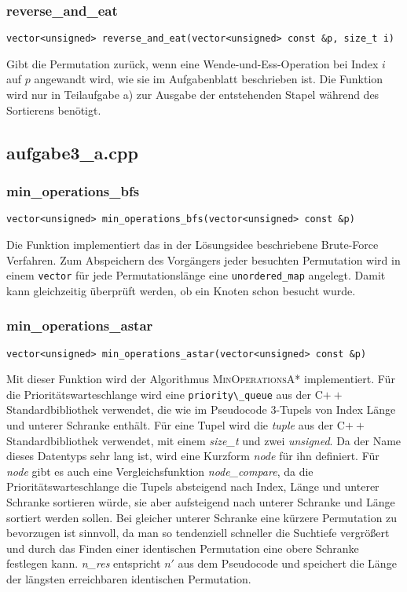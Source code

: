 \documentclass[a4paper, 10pt, ngerman]{article}
\begin{document}
\subsubsection{reverse\_and\_eat}
\verb|vector<unsigned> reverse_and_eat(vector<unsigned> const &p, size_t i)|
\medskip

\noindent Gibt die Permutation zurück, wenn eine Wende-und-Ess-Operation bei Index $i$ auf $p$ angewandt wird, wie sie im Aufgabenblatt beschrieben ist. Die Funktion wird nur in Teilaufgabe a) zur Ausgabe der entstehenden Stapel während des Sortierens benötigt.

\subsection{aufgabe3\_a.cpp}

\subsubsection{min\_operations\_bfs}
\verb|vector<unsigned> min_operations_bfs(vector<unsigned> const &p)|
\medskip

\noindent Die Funktion implementiert das in der Lösungsidee beschriebene Brute-Force Verfahren. Zum Abspeichern des Vorgängers jeder besuchten Permutation wird in einem \verb|vector| für jede Permutationslänge eine \verb|unordered_map| angelegt. Damit kann gleichzeitig überprüft werden, ob ein Knoten schon besucht wurde.

\subsubsection{min\_operations\_astar}
\verb|vector<unsigned> min_operations_astar(vector<unsigned> const &p)|
\medskip

\noindent Mit dieser Funktion wird der Algorithmus \textsc{MinOperationsA*} implementiert. Für die Prioritätswarteschlange wird eine \verb|priority\_queue| aus der C$++$ Standardbibliothek verwendet, die wie im Pseudocode 3-Tupels von Index Länge und unterer Schranke enthält. Für eine Tupel wird die \emph{tuple} aus der C$++$ Standardbibliothek verwendet, mit einem \emph{size\_t} und zwei \emph{unsigned}. Da der Name dieses Datentyps sehr lang ist, wird eine Kurzform \emph{node} für ihn definiert. Für \emph{node} gibt es auch eine Vergleichsfunktion \emph{node\_compare}, da die Prioritätswarteschlange die Tupels absteigend nach Index, Länge und unterer Schranke sortieren würde, sie aber aufsteigend nach unterer Schranke und Länge sortiert werden sollen. Bei gleicher unterer Schranke eine kürzere Permutation zu bevorzugen ist sinnvoll, da man so tendenziell schneller die Suchtiefe vergrößert und durch das Finden einer identischen Permutation eine obere Schranke festlegen kann. \emph{n\_res} entspricht $n'$ aus dem Pseudocode und speichert die Länge der längsten erreichbaren identischen Permutation.
\end{document}
